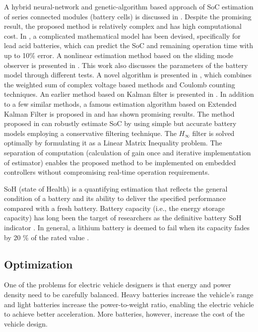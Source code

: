  A hybrid neural-network and genetic-algorithm based approach of SoC estimation  of  series  connected  modules  (battery  cells)  is discussed in \cite{ZS_11}. Despite the promising result, the proposed method is relatively complex and has high computational cost. In \cite{ZS_12}, a complicated mathematical model has been devised, specifically for lead acid batteries, which can predict the SoC and remaining operation time with up to 10\% error. A nonlinear estimation method based on the sliding mode observer is presented in \cite{ZS_13}. This work also discusses the parameters of the  battery  model  through  different  tests.  A  novel  algorithm is  presented  in \cite{ZS_14}, which  combines  the  weighted  sum  of complex  voltage  based  methods  and Coulomb  counting  techniques.  An  earlier  method  based  on Kalman  filter  is  presented  in \cite{ZS_15,ZS_16,ZS_17,ZS_18}.  In  addition  to  a few similar methods, a famous estimation algorithm based on Extended Kalman Filter is proposed in \cite{ZS_19,ZS_20,ZS_21,ZS_22,ZS_23,ZS_24} and has shown promising results. The method proposed in \cite{ZS_shaheer} can robustly estimate SoC by using simple but accurate battery models employing a conservative filtering technique. The $H_\infty$ filter is  solved  optimally  by  formulating  it  as  a Linear Matrix Inequality problem. The separation of computation (calculation of gain once and iterative implementation of estimator) enables the proposed method to be implemented on embedded controllers without compromising real-time operation requirements.

SoH (state of Health) is a quantifying estimation that reflects the general
condition of a battery and its ability to deliver the specified
performance compared with a fresh battery. Battery
capacity (i.e., the energy storage capacity) has long been the
target of researchers as the definitive battery SoH indicator \cite{ZS_yu}. In general, a lithium battery is deemed to fail when its capacity
fades by 20 \% of the rated value \cite{ZS_pas}.

\subsection{Optimization}

One of the problems for electric vehicle designers is that energy and power density need to be carefully balanced. Heavy batteries increase the vehicle’s range and light batteries increase the power-to-weight ratio, enabling the electric vehicle to achieve better acceleration.
More batteries, however, increase the cost of the vehicle design. 

